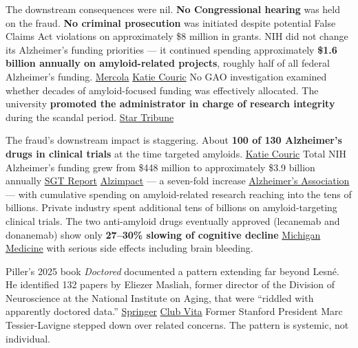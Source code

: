 The downstream consequences were nil. \textbf{No Congressional hearing} was held on the fraud. \textbf{No criminal prosecution} was initiated despite potential False Claims Act violations on approximately \$8 million in grants. NIH did not change its Alzheimer's funding priorities --- it continued spending approximately \textbf{\$1.6 billion annually on amyloid-related projects}, roughly half of all federal Alzheimer's funding. \href{https://articles.mercola.com/sites/articles/archive/2026/03/26/alzheimers-amyloid-hypothesis-fraud.aspx}{Mercola} \href{https://katiecouric.com/health/alzheimers-research-fraud-matthew-schrag-sylvain-lesne/}{Katie Couric} No GAO investigation examined whether decades of amyloid-focused funding was effectively allocated. The university \textbf{promoted the administrator in charge of research integrity} during the scandal period. \href{https://www.startribune.com/umn-professors-fabrication-plagiarism-scandals/601554124}{Star Tribune}

The fraud's downstream impact is staggering. About \textbf{100 of 130 Alzheimer's drugs in clinical trials} at the time targeted amyloids. \href{https://katiecouric.com/health/alzheimers-research-fraud-matthew-schrag-sylvain-lesne/}{Katie Couric} Total NIH Alzheimer's funding grew from \$448 million to approximately \$3.9 billion annually \href{https://www.sgtreport.com/2026/03/the-great-alzheimers-scam-and-the-proven-cures-theyve-buried-for-billions-3/}{SGT Report} \href{https://alzimpact.org/research}{Alzimpact} --- a seven-fold increase \href{https://www.alz.org/get-involved-now/advocate/research-funding}{Alzheimer's Association} --- with cumulative spending on amyloid-related research reaching into the tens of billions. Private industry spent additional tens of billions on amyloid-targeting clinical trials. The two anti-amyloid drugs eventually approved (lecanemab and donanemab) show only \textbf{27--30\% slowing of cognitive decline} \href{https://www.michiganmedicine.org/health-lab/everything-you-know-about-alzheimers-wrong}{Michigan Medicine} with serious side effects including brain bleeding.

Piller's 2025 book \emph{Doctored} documented a pattern extending far beyond Lesné. He identified 132 papers by Eliezer Masliah, former director of the Division of Neuroscience at the National Institute on Aging, that were ``riddled with apparently doctored data.'' \href{https://link.springer.com/article/10.1007/s11357-025-01661-2}{Springer} \href{https://www.clubvita.net/us/news-and-insights/alzheimers-research-scandal}{Club Vita} Former Stanford President Marc Tessier-Lavigne stepped down over related concerns. The pattern is systemic, not individual.

